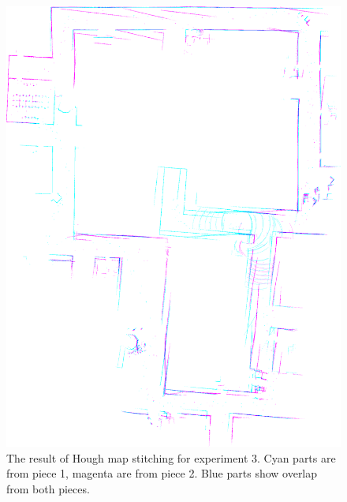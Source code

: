 \begin{figure}[ht]
\centering
  \includegraphics[width=\textwidth]{images/experiment/map4/results/result_color_0.png}
  \caption{The result of Hough map stitching for experiment 3. Cyan parts are from piece 1, magenta are from piece 2. Blue parts show overlap from both pieces.}
  \label{fig:map4-hough}
\end{figure}

